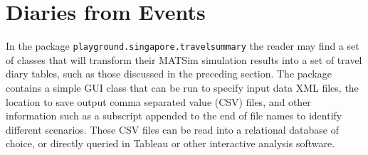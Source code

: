 \section{Diaries from Events}
In the package \lstinline|playground.singapore.travelsummary| the reader may find a set of classes that will transform their MATSim simulation results into a set of travel diary tables, such as those discussed in the preceding section. The package contains a simple GUI class that can be run to specify input data XML files, the location to save output comma separated value (CSV) files, and other information such as a subscript appended to the end of file names to identify different scenarios. These CSV files can be read into a relational database of choice, or directly queried in Tableau or other interactive analysis software.





